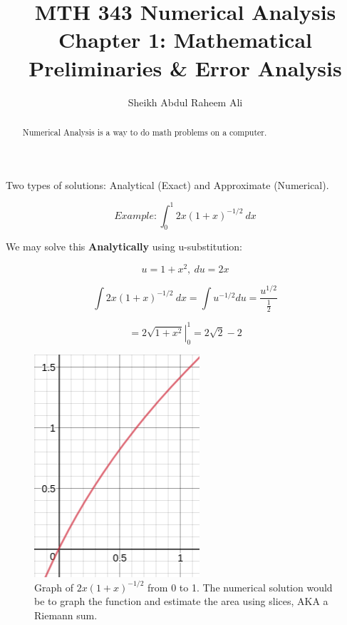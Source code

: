 \documentclass[]{article}
\title{MTH 343 Numerical Analysis Chapter 1: Mathematical Preliminaries \& Error Analysis}
\author{Sheikh Abdul Raheem Ali}
\begin{document}
\maketitle

\begin{abstract}
	Numerical Analysis is a way to do math problems on a computer. 
\end{abstract}


Two types of solutions: Analytical (Exact) and Approximate (Numerical).


\[ Example: \int_{0}^{1} \! 2x(1+x)^{-1/2} \ dx \]

We may solve this \textbf{Analytically} using u-substitution: 

\[ u = 1 + x^2, \ du = 2x \]

\[\int \! 2x(1+x)^{-1/2} \ dx = \int \! u^{-1/2} du  = \frac{u^{1/2}}{\frac{1}{2}} \]

\[ = \left. 2\sqrt{1+x^2} \right|_{0}^1 = 2\sqrt{2} - 2 \]

\begin{figure}
	\centering
	\includegraphics[width=\linewidth]{graph.png}
	\caption{Graph of $ 2x(1+x)^{-1/2} $ from 0 to 1. The numerical solution would be to graph the function and estimate the area using slices, AKA a Riemann sum.  }
	\label{fig:graph}
\end{figure}
\end{document}
